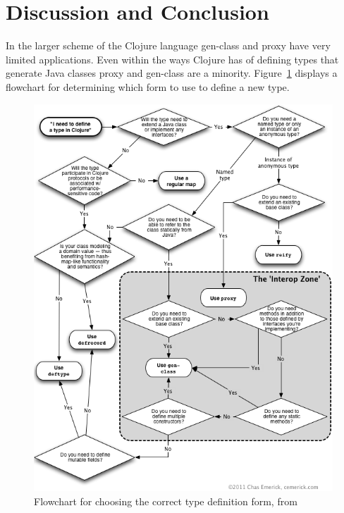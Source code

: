 \documentclass[12pt]{article}
\begin{document}
		
\section{Discussion and Conclusion}\label{sec:sugg}
	In the larger scheme of the Clojure language gen-class and proxy have very limited applications. Even within the ways Clojure has of defining types that generate Java classes proxy and gen-class are a minority. Figure~\ref{type:flow} displays a  flowchart for determining which form to use to define a new type.
	
	\begin{figure}[H]
	\begin{center}
	\includegraphics[scale=.55]{images/choosingtypeforms.png}
	\caption{Flowchart for choosing the correct type definition form, from \cite{choosing-types}\label{type:flow}}
	\end{center}	
	\end{figure}
	
\end{document}
